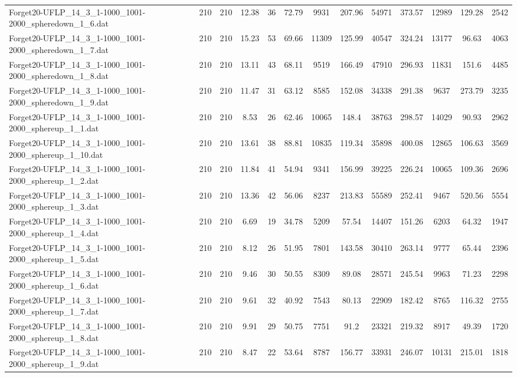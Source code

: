 \begin{table}[!ht]
{\begin{tabular}{lcccccccccccc}
Forget20-UFLP\_14\_3\_1-1000\_1001-2000\_spheredown\_1\_6.dat & 210 & 210 & 12.38 & 36 & 72.79 & 9931 & 207.96 & 54971 & 373.57 & 12989 & 129.28 & 2542 \\
Forget20-UFLP\_14\_3\_1-1000\_1001-2000\_spheredown\_1\_7.dat & 210 & 210 & 15.23 & 53 & 69.66 & 11309 & 125.99 & 40547 & 324.24 & 13177 & 96.63 & 4063 \\
Forget20-UFLP\_14\_3\_1-1000\_1001-2000\_spheredown\_1\_8.dat & 210 & 210 & 13.11 & 43 & 68.11 & 9519 & 166.49 & 47910 & 296.93 & 11831 & 151.6 & 4485 \\
Forget20-UFLP\_14\_3\_1-1000\_1001-2000\_spheredown\_1\_9.dat & 210 & 210 & 11.47 & 31 & 63.12 & 8585 & 152.08 & 34338 & 291.38 & 9637 & 273.79 & 3235 \\
Forget20-UFLP\_14\_3\_1-1000\_1001-2000\_sphereup\_1\_1.dat & 210 & 210 & 8.53 & 26 & 62.46 & 10065 & 148.4 & 38763 & 298.57 & 14029 & 90.93 & 2962 \\
Forget20-UFLP\_14\_3\_1-1000\_1001-2000\_sphereup\_1\_10.dat & 210 & 210 & 13.61 & 38 & 88.81 & 10835 & 119.34 & 35898 & 400.08 & 12865 & 106.63 & 3569 \\
Forget20-UFLP\_14\_3\_1-1000\_1001-2000\_sphereup\_1\_2.dat & 210 & 210 & 11.84 & 41 & 54.94 & 9341 & 156.99 & 39225 & 226.24 & 10065 & 109.36 & 2696 \\
Forget20-UFLP\_14\_3\_1-1000\_1001-2000\_sphereup\_1\_3.dat & 210 & 210 & 13.36 & 42 & 56.06 & 8237 & 213.83 & 55589 & 252.41 & 9467 & 520.56 & 5554 \\
Forget20-UFLP\_14\_3\_1-1000\_1001-2000\_sphereup\_1\_4.dat & 210 & 210 & 6.69 & 19 & 34.78 & 5209 & 57.54 & 14407 & 151.26 & 6203 & 64.32 & 1947 \\
Forget20-UFLP\_14\_3\_1-1000\_1001-2000\_sphereup\_1\_5.dat & 210 & 210 & 8.12 & 26 & 51.95 & 7801 & 143.58 & 30410 & 263.14 & 9777 & 65.44 & 2396 \\
Forget20-UFLP\_14\_3\_1-1000\_1001-2000\_sphereup\_1\_6.dat & 210 & 210 & 9.46 & 30 & 50.55 & 8309 & 89.08 & 28571 & 245.54 & 9963 & 71.23 & 2298 \\
Forget20-UFLP\_14\_3\_1-1000\_1001-2000\_sphereup\_1\_7.dat & 210 & 210 & 9.61 & 32 & 40.92 & 7543 & 80.13 & 22909 & 182.42 & 8765 & 116.32 & 2755 \\
Forget20-UFLP\_14\_3\_1-1000\_1001-2000\_sphereup\_1\_8.dat & 210 & 210 & 9.91 & 29 & 50.75 & 7751 & 91.2 & 23321 & 219.32 & 8917 & 49.39 & 1720 \\
Forget20-UFLP\_14\_3\_1-1000\_1001-2000\_sphereup\_1\_9.dat & 210 & 210 & 8.47 & 22 & 53.64 & 8787 & 156.77 & 33931 & 246.07 & 10131 & 215.01 & 1818 \\

\end{tabular}}
\end{table}
